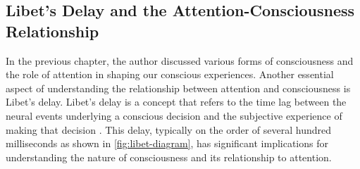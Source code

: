 \documentclass[10pt]{article}
\begin{document}
\begin{sloppypar}
  \vspace{10pt} %
  \begin{table}[ht]
    \centering
    \renewcommand{\arraystretch}{1.5}
    \setlength{\tabcolsep}{12pt}
    \caption{Types of attention and their descriptions.}
    \label{tab:overview-attention}
  \end{table}

  \subsection{Libet’s Delay and the Attention-Consciousness Relationship}
  \label{sec:libet}

  In the previous chapter, the author discussed various forms of consciousness and the role of attention in shaping our conscious experiences. Another essential aspect of understanding the relationship between attention and consciousness is Libet’s delay. Libet’s delay is a concept that refers to the time lag between the neural events underlying a conscious decision and the subjective experience of making that decision \citep{libet_time_1983}. This delay, typically on the order of several hundred milliseconds as shown in \autoref{fig:libet-diagram}, has significant implications for understanding the nature of consciousness and its relationship to attention.


\end{sloppypar}
\end{document}

